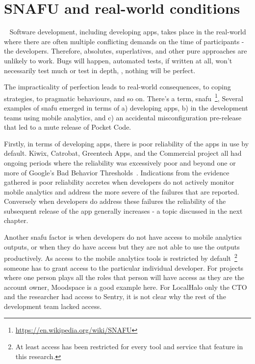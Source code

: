 \section{SNAFU and real-world conditions}~\label{aiu-snafu-and-real-world-conditions-section}
Software development, including developing apps, takes place in the real-world where there are often multiple conflicting demands on the time of participants - the developers. Therefore, absolutes, superlatives, and other pure approaches are unlikely to work. Bugs will happen, automated tests, if written at all, won't necessarily test much or test in depth, , nothing will be perfect.

The impracticality of perfection leads to real-world consequences, to coping strategies, to pragmatic behaviours, and so on. There's a term, snafu~\footnote{\url{https://en.wikipedia.org/wiki/SNAFU}}, Several examples of snafu emerged in terms of a) developing apps, b) in the development teams using mobile analytics, and c) an accidental misconfiguration pre-release that led to a mute release of Pocket Code.

Firstly, in terms of developing apps, there is poor reliability of the apps in use by default. Kiwix, Catrobat, Greentech Apps, and the Commercial project all had ongoing periods where the reliability was excessively poor and beyond one or more of Google's Bad Behavior Thresholds~\citep{play_console_help_android_vitals_2019}. Indications from the evidence gathered is poor reliability accretes when developers do not actively monitor mobile analytics and address the more severe of the failures that are reported. Conversely when developers do address these failures the reliability of the subsequent release of the app generally increases - a topic discussed in the next chapter.

Another snafu factor is when developers do not have access to mobile analytics outputs, or when they do have access but they are not able to use the outputs productively. As access to the mobile analytics tools is restricted by default~\footnote{At least access has been restricted for every tool and service that feature in this research.} someone has to grant access to the particular individual developer. For projects where one person plays all the roles that person will have access as they are the account owner, Moodspace is a good example here. For LocalHalo only the CTO and the researcher had access to Sentry, it is not clear why the rest of the development team lacked access.

